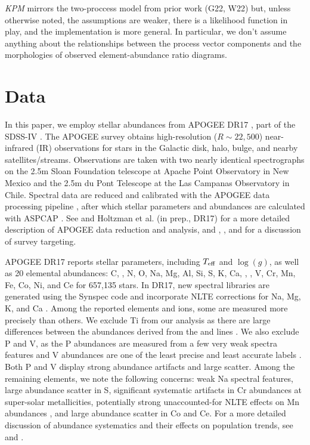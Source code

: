 \documentclass[modern]{aastex631}
\newcommand{\logg}{\log(g)}
\newcommand{\teff}{T_{\rm eff}}
\newcommand{\name}{\textsl{KPM}}
\begin{document}
\bigskip
\name{} mirrors the two-proccess model from prior work (G22, W22) but, unless otherwise noted, the assumptions are weaker, there is a likelihood function in play, and the implementation is more general.
In particular, we don't assume anything about the relationships between the process vector components and the morphologies of observed element-abundance ratio diagrams.

\section{Data}\label{sec:data}

In this paper, we employ stellar abundances from APOGEE DR17 \citep{abdurrouf2022}, part of the SDSS-IV \citep{majewski2017}. The APOGEE survey obtains high-resolution ($R\sim22,500$) near-infrared (IR) observations \citep{wilson2019} for stars in the Galactic disk, halo, bulge, and nearby satellites/streams. Observations are taken with two nearly identical spectrographs on the 2.5m Sloan Foundation telescope \citep{wilson2019} at Apache Point Observatory in New Mexico and the 2.5m du Pont Telescope \citep{bowen1973} at the Las Campanas Observatory in Chile. Spectral data are reduced and calibrated with the APOGEE data processing pipeline \citep{nidever2015}, after which stellar parameters and abundances are calculated with ASPCAP \citep[APOGEE Stellar Parameter and Chemical Abundance Pipeline;][]{holtzman2015, garcia2016}. See \citet[][DR16]{jonsson2020} and Holtzman et al. (in prep., DR17) for a more detailed description of APOGEE data reduction and analysis, and \citet{zasowski2013, zasowski2017}, \citet{beaton2021}, and \citet{santana2021} for a discussion of survey targeting.

APOGEE DR17 reports stellar parameters, including $\teff$ and $\logg$, as well as 20 elemental abundances: C, , N, O, Na, Mg, Al, Si, S, K, Ca, , , V, Cr, Mn, Fe, Co, Ni, and Ce for 657,135 stars. In DR17, new spectral libraries \citep{hubeny2021} are generated using the Synspec code and incorporate NLTE corrections for Na, Mg, K, and Ca \citep{osorio2020}. Among the reported elements and ions, some are measured more precisely than others. We exclude Ti from our analysis as there are large differences between the abundances derived from the  and  lines \citep{jonsson2020}. We also exclude P and V, as the P abundances are measured from a few very weak spectra features and V abundances are one of the least precise and least accurate labels \citep{jonsson2020}. Both P and V display strong abundance artifacts and large scatter. Among the remaining elements, we note the following concerns: weak Na spectral features, large abundance scatter in S, significant systematic artifacts in Cr abundances at super-solar metallicities, potentially strong unaccounted-for NLTE effects on Mn abundances \citep{bergemann2019}, and large abundance scatter in Co and Ce. For a more detailed discussion of abundance systematics and their effects on population trends, see \citet{jonsson2020} and \citet{griffith2021a}.
\end{document}
